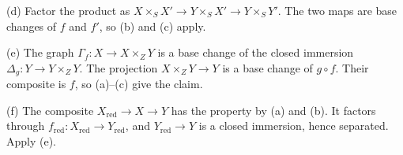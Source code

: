 (d) Factor the product as $X\times_SX'\to Y\times_SX'\to Y\times_SY'$. The two maps are base changes of $f$ and $f'$, so (b) and (c) apply.

(e) The graph $\Gamma_f:X\to X\times_ZY$ is a base change of the closed immersion $\Delta_g:Y\to Y\times_ZY$. The projection $X\times_ZY\to Y$ is a base change of $g\circ f$. Their composite is $f$, so (a)--(c) give the claim.

(f) The composite $X_{\mathrm{red}}\to X\to Y$ has the property by (a) and (b). It factors through $f_{\mathrm{red}}:X_{\mathrm{red}}\to Y_{\mathrm{red}}$, and $Y_{\mathrm{red}}\to Y$ is a closed immersion, hence separated. Apply (e).
